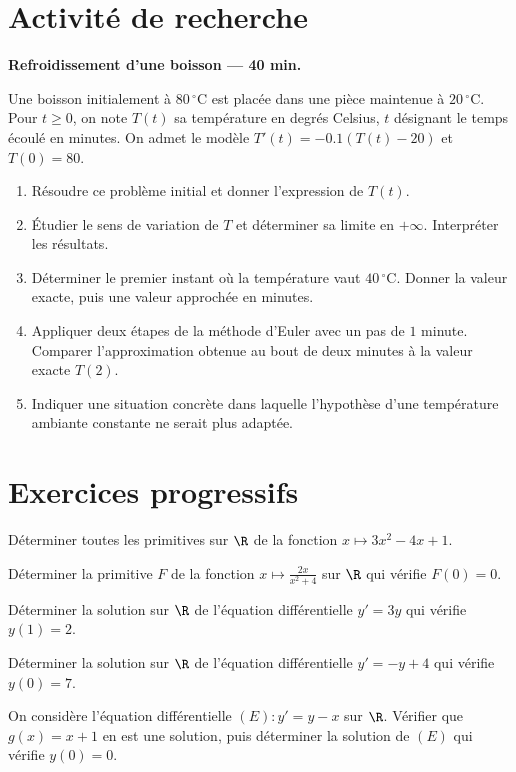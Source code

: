 \section{Activité de recherche}\textbf{Refroidissement d'une boisson --- 40 min.}\par Une boisson initialement à $80\,^{\circ}\mathrm C$ est placée dans une pièce maintenue à $20\,^{\circ}\mathrm C$. Pour $t\ge0$, on note $T(t)$ sa température en degrés Celsius, $t$ désignant le temps écoulé en minutes. On admet le modèle $T' (t)=-\num{0,1}(T(t)-20)$ et $T(0)=80$.
\begin{enumerate}\item Résoudre ce problème initial et donner l'expression de $T(t)$.
\item Étudier le sens de variation de $T$ et déterminer sa limite en $+\infty$. Interpréter les résultats.
\item Déterminer le premier instant où la température vaut $40\,^{\circ}\mathrm C$. Donner la valeur exacte, puis une valeur approchée en minutes.
\item Appliquer deux étapes de la méthode d'Euler avec un pas de $1$ minute. Comparer l'approximation obtenue au bout de deux minutes à la valeur exacte $T(2)$.
\item Indiquer une situation concrète dans laquelle l'hypothèse d'une température ambiante constante ne serait plus adaptée.\end{enumerate}

\mxnewpage
\section{Exercices progressifs}

Déterminer toutes les primitives sur $\R$ de la fonction $x\mapsto3x^2-4x+1$.

Déterminer la primitive $F$ de la fonction $x\mapsto\frac{2x}{x^2+4}$ sur $\R$ qui vérifie $F(0)=0$.

Déterminer la solution sur $\R$ de l'équation différentielle $y' =3y$ qui vérifie $y(1)=2$.

Déterminer la solution sur $\R$ de l'équation différentielle $y' =-y+4$ qui vérifie $y(0)=7$.

On considère l'équation différentielle $(E):y' =y-x$ sur $\R$. Vérifier que $g(x)=x+1$ en est une solution, puis déterminer la solution de $(E)$ qui vérifie $y(0)=0$.


